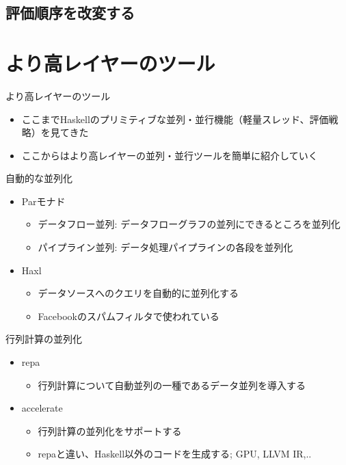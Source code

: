 \documentclass[unicode,12pt]{beamer}
\begin{document}
\subsection{評価順序を改変する}

\begin{frame}{}

\end{frame}

\section{より高レイヤーのツール}

\begin{frame}{より高レイヤーのツール}
  \begin{itemize}
    \item ここまでHaskellのプリミティブな並列・並行機能（軽量スレッド、評価戦略）を見てきた
    \item ここからはより高レイヤーの並列・並行ツールを簡単に紹介していく
  \end{itemize}
\end{frame}

\begin{frame}{自動的な並列化}
  \begin{itemize}
  \item Parモナド
    \begin{itemize}
    \item データフロー並列: データフローグラフの並列にできるところを並列化
    \item パイプライン並列: データ処理パイプラインの各段を並列化
    \end{itemize}
  \item Haxl
    \begin{itemize}
    \item データソースへのクエリを自動的に並列化する
    \item Facebookのスパムフィルタで使われている
    \end{itemize}
  \end{itemize}
\end{frame}

\begin{frame}{行列計算の並列化}
  \begin{itemize}
  \item repa
    \begin{itemize}
      \item 行列計算について自動並列の一種であるデータ並列を導入する
    \end{itemize}
  \item accelerate
    \begin{itemize}
      \item 行列計算の並列化をサポートする
      \item repaと違い、Haskell以外のコードを生成する; GPU, LLVM IR,..
      \end{itemize}
  \end{itemize}
\end{frame}
\end{document}
